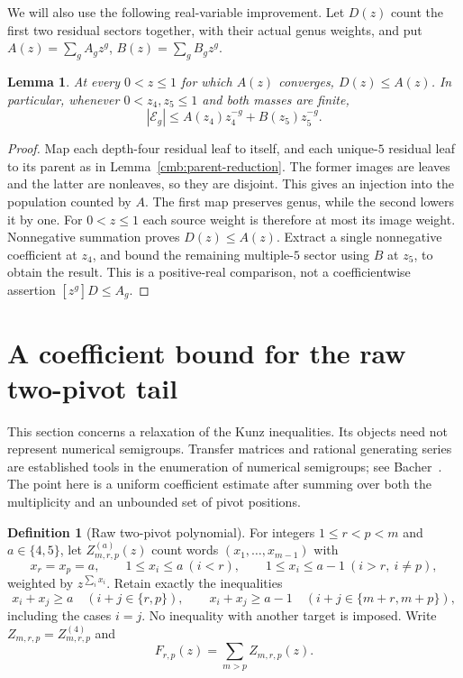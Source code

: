 \documentclass[11pt]{amsart}
\newtheorem{lemma}[theorem]{Lemma}
\theoremstyle{definition}
\newtheorem{definition}[theorem]{Definition}
\theoremstyle{remark}
\numberwithin{equation}{section}
\begin{document}
We will also use the following real-variable improvement. Let $D(z)$ count
the first two residual sectors together, with their actual genus weights,
and put $A(z)=\sum_gA_gz^g$, $B(z)=\sum_gB_gz^g$.
\begin{lemma}\label{cmb:compensation}
At every $0<z\le1$ for which $A(z)$ converges, $D(z)\le A(z)$.
In particular, whenever $0<z_4,z_5\le1$ and both masses are finite,
\begin{equation}\label{cmb:mass-extraction}
 |\mathcal E_g|\le A(z_4)z_4^{-g}+B(z_5)z_5^{-g}.
\end{equation}
\end{lemma}
\begin{proof}
Map each depth-four residual leaf to itself, and each unique-$5$ residual
leaf to its parent as in Lemma~\ref{cmb:parent-reduction}. The former images
are leaves and the latter are nonleaves, so they are disjoint. This gives
an injection into the population counted by $A$. The first map preserves
genus, while the second lowers it by one. For $0<z\le1$ each source weight
is therefore at most its image weight. Nonnegative summation proves
$D(z)\le A(z)$. Extract a single nonnegative coefficient at $z_4$, and bound
the remaining multiple-$5$ sector using $B$ at $z_5$, to obtain the result.
This is a positive-real comparison, not a coefficientwise assertion
$[z^g]D\le A_g$.
\end{proof}

\section{A coefficient bound for the raw two-pivot tail}\label{raw:section}

This section concerns a relaxation of the Kunz inequalities.  Its objects need
not represent numerical semigroups.  Transfer matrices and rational generating
series are established tools in the enumeration of numerical semigroups; see
Bacher~\cite{Bacher}.  The point here is a uniform coefficient estimate after
summing over both the multiplicity and an unbounded set of pivot positions.

\begin{definition}[Raw two-pivot polynomial]\label{raw:definition}
For integers $1\le r<p<m$ and $a\in\{4,5\}$, let
$Z^{(a)}_{m,r,p}(z)$ count words $(x_1,\ldots,x_{m-1})$ with
\[
 x_r=x_p=a,\qquad
 1\le x_i\le a\ (i<r),\qquad
 1\le x_i\le a-1\ (i>r,\ i\ne p),
\]
weighted by $z^{\sum_i x_i}$.  Retain exactly the inequalities
\[
 x_i+x_j\ge a\quad(i+j\in\{r,p\}),\qquad
 x_i+x_j\ge a-1\quad(i+j\in\{m+r,m+p\}),
\]
including the cases $i=j$.  No inequality with another target is imposed.
Write $Z_{m,r,p}=Z^{(4)}_{m,r,p}$ and
\[
 F_{r,p}(z)=\sum_{m>p}Z_{m,r,p}(z).
\]
\end{definition}
\end{document}
